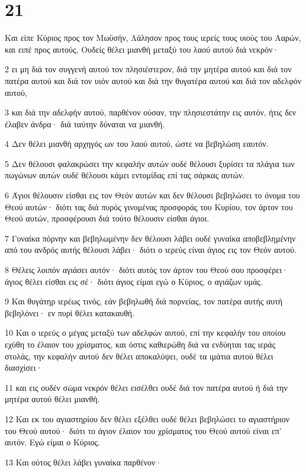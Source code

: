 \chapter{21}

\par Και είπε Κύριος προς τον Μωϋσήν, Λάλησον προς τους ιερείς τους υιούς του Ααρών, και ειπέ προς αυτούς, Ουδείς θέλει μιανθή μεταξύ του λαού αυτού διά νεκρόν·
\par 2 ει μη διά τον συγγενή αυτού τον πλησιέστερον, διά την μητέρα αυτού και διά τον πατέρα αυτού και διά τον υιόν αυτού και διά την θυγατέρα αυτού και διά τον αδελφόν αυτού,
\par 3 και διά την αδελφήν αυτού, παρθένον ούσαν, την πλησιεστάτην εις αυτόν, ήτις δεν έλαβεν άνδρα· διά ταύτην δύναται να μιανθή.
\par 4 Δεν θέλει μιανθή αρχηγός ων του λαού αυτού, ώστε να βεβηλώση εαυτόν.
\par 5 Δεν θέλουσι φαλακρώσει την κεφαλήν αυτών ουδέ θέλουσι ξυρίσει τα πλάγια των πωγώνων αυτών ουδέ θέλουσι κάμει εντομίδας επί τας σάρκας αυτών.
\par 6 Άγιοι θέλουσιν είσθαι εις τον Θεόν αυτών και δεν θέλουσι βεβηλώσει το όνομα του Θεού αυτών· διότι τας διά πυρός γινομένας προσφοράς του Κυρίου, τον άρτον του Θεού αυτών, προσφέρουσι διά τούτο θέλουσιν είσθαι άγιοι.
\par 7 Γυναίκα πόρνην και βεβηλωμένην δεν θέλουσι λάβει ουδέ γυναίκα αποβεβλημένην από του ανδρός αυτής θέλουσι λάβει· διότι ο ιερεύς είναι άγιος εις τον Θεόν αυτού.
\par 8 Θέλεις λοιπόν αγιάσει αυτόν· διότι αυτός τον άρτον του Θεού σου προσφέρει· άγιος θέλει είσθαι εις σέ· διότι άγιος είμαι εγώ ο Κύριος, ο αγιάζων υμάς.
\par 9 Και θυγάτηρ ιερέως τινός, εάν βεβηλωθή διά πορνείας, τον πατέρα αυτής αυτή βεβηλόνει· εν πυρί θέλει κατακαυθή.
\par 10 Και ο ιερεύς ο μέγας μεταξύ των αδελφών αυτού, επί την κεφαλήν του οποίου εχύθη το έλαιον του χρίσματος, και όστις καθιερώθη διά να ενδύηται τας ιεράς στολάς, την κεφαλήν αυτού δεν θέλει αποκαλύψει, ουδέ τα ιμάτια αυτού θέλει διασχίσει·
\par 11 και εις ουδέν σώμα νεκρόν θέλει εισέλθει ουδέ διά τον πατέρα αυτού ή διά την μητέρα αυτού θέλει μιανθή.
\par 12 Και εκ του αγιαστηρίου δεν θέλει εξέλθει ουδέ θέλει βεβηλώσει το αγιαστήριον του Θεού αυτού· διότι το άγιον έλαιον του χρίσματος του Θεού αυτού είναι επ' αυτόν. Εγώ είμαι ο Κύριος.
\par 13 Και ούτος θέλει λάβει γυναίκα παρθένον·
